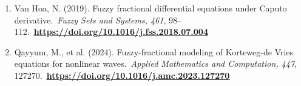 \documentclass[
]{article}
\begin{document}
\begin{enumerate}
  Sheinov, V. V., \& Dziavitsyn, I. A. (2021). Modeling cognitive, behavioural, and emotional interplay in addiction: A three-factor fractional approach. \emph{Chaos, Solitons \& Fractals, 144}, 110695. \href{https://doi.org/10.1016/j.chaos.2021.110695}{\ul{https://doi.org/10.1016/j.chaos.2021.110695}}
\item
  Van Hoa, N. (2019). Fuzzy fractional differential equations under Caputo derivative.~\emph{Fuzzy Sets and Systems, 461}, 98--112.~\href{https://doi.org/10.1016/j.fss.2018.07.004}{\textbf{\ul{https://doi.org/10.1016/j.fss.2018.07.004}}}
\item
  Qayyum, M., et al. (2024). Fuzzy-fractional modeling of Korteweg-de Vries equations for nonlinear waves.~\emph{Applied Mathematics and Computation, 447}, 127270.~\href{https://doi.org/10.1016/j.amc.2023.127270}{\textbf{\ul{https://doi.org/10.1016/j.amc.2023.127270}}}
\end{enumerate}
\end{document}
